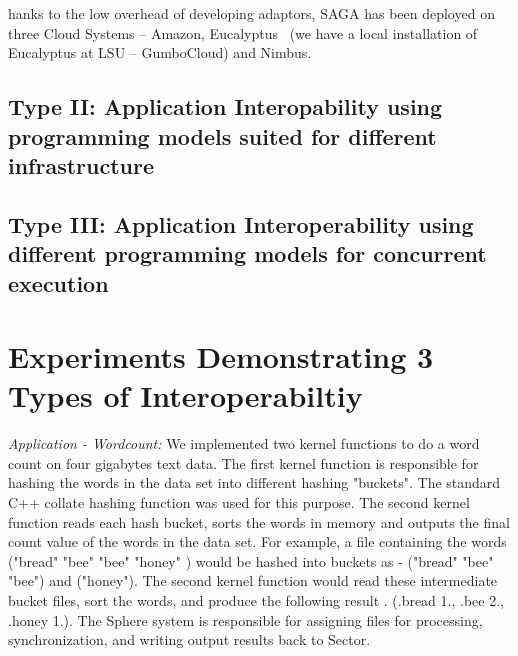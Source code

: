\documentclass[3p,twocolumn]{elsarticle}
\begin{document}
hanks to the low overhead of developing adaptors, SAGA has been
deployed on three Cloud Systems -- Amazon,
Eucalyptus~\cite{eucalyptus} (we have a local installation of
Eucalyptus at LSU -- GumboCloud) and Nimbus.




\subsection{Type II: Application Interopability using programming
  models suited for different infrastructure}


\subsection{Type III: Application Interoperability using different
  programming models for concurrent execution}


            

\section{Experiments Demonstrating 3 Types of Interoperabiltiy}

{\it Application - Wordcount: } We implemented two kernel functions to
do a word count on four gigabytes text data.  The first kernel
function is responsible for hashing the words in the data set into
different hashing "buckets". The standard C++ collate hashing function
was used for this purpose. The second kernel function reads each hash
bucket, sorts the words in memory and outputs the final count value of
the words in the data set.  For example, a file containing the words
("bread" "bee" "bee" "honey" ) would be hashed into buckets as -
("bread" "bee" "bee") and ("honey").  The second kernel function would
read these intermediate bucket files, sort the words, and produce the
following result . (.bread 1., .bee 2., .honey 1.).  The Sphere system
is responsible for assigning files for processing, synchronization,
and writing output results back to Sector.
\end{document}
